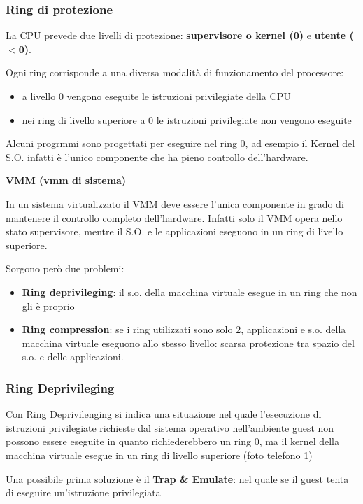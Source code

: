 \documentclass{article}
\begin{document}
\subsubsection{Ring di protezione}

La CPU prevede due livelli di protezione: \textbf{supervisore o kernel (0)} e \textbf{utente ($<$0)}.

Ogni ring corrisponde a una diversa modalità di funzionamento del processore:
\begin{itemize}
    \item a livello 0 vengono eseguite le istruzioni privilegiate della CPU
    \item nei ring di livello superiore a 0 le istruzioni privilegiate non vengono eseguite
\end{itemize}

Alcuni progrmmi sono progettati per eseguire nel ring 0, ad esempio il Kernel del S.O. infatti è l'unico componente che ha pieno controllo dell'hardware.

\vspace{3mm}
\textbf{VMM (vmm di sistema)}

In un sistema virtualizzato il VMM deve essere l'unica componente in grado di mantenere il controllo completo dell'hardware. Infatti solo il VMM opera nello stato supervisore, 
mentre il S.O. e le applicazioni eseguono in un ring di livello superiore.

Sorgono però due problemi:
\begin{itemize}
    \item \textbf{Ring deprivileging}: il s.o. della macchina virtuale esegue in un ring che non gli è proprio
    \item \textbf{Ring compression}: se i ring utilizzati sono solo 2, applicazioni e s.o. della macchina virtuale eseguono allo stesso livello: 
    scarsa protezione tra spazio del s.o. e delle applicazioni.
\end{itemize}

\subsubsection{Ring Deprivileging}
Con Ring Deprivilenging si indica una situazione nel quale l'esecuzione di istruzioni privilegiate richieste dal sistema operativo nell'ambiente guest non
possono essere eseguite in quanto richiederebbero un ring 0, ma il kernel della macchina virtuale esegue in un ring di livello superiore (foto telefono 1)

Una possibile prima soluzione è il \textbf{Trap \& Emulate}: nel quale se il guest tenta di eseguire un'istruzione privilegiata
\end{document}
